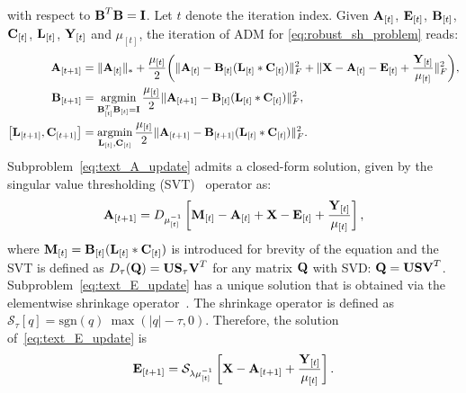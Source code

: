 with respect to $\boldsymbol{\mathbf{B}}^T \boldsymbol{\mathbf{B}} = \boldsymbol{\mathbf{I}}$. Let $t$ denote the iteration index. 
Given $\boldsymbol{\mathbf{A}}_{[t]}$, $\boldsymbol{\mathbf{E}}_{[t]}$, $\boldsymbol{\mathbf{B}}_{[t]}$, $\boldsymbol{\mathbf{C}}_{[t]}$, $\boldsymbol{\mathbf{L}}_{[t]}$, $\boldsymbol{\mathbf{Y}}_{[t]}$
and $\mu_{[t]}$, the iteration of ADM for \cref{eq:robust_sh_problem} reads:
\begin{align}
    \bb{A}_{[t+1]} &= \lVert \bb{A}_{[t]} \rVert_{*} + \frac{\mu_{[t]}}{2} \biggl( \lVert \bb{A}_{[t]} - \bb{B}_{[t]} (\bb{L}_{[t]} \ast \bb{C}_{[t]}) \rVert^{2}_{F} + \lVert \bb{X} - \bb{A}_{[t]} - \bb{E}_{[t]} + \frac{\bb{Y}_{[t]}}{\mu_{[t]}} \rVert_{F}^{2} \biggr), \label{eq:text_A_update} \\
    \bb{B}_{[t+1]} &= \argmin_{\bb{B}_{[t]}^T \bb{B}_{[t]} = \bb{I}} \frac{\mu_{[t]}}{2} \lVert \bb{A}_{[t+1]} - \bb{B}_{[t]} (\bb{L}_{[t]} \ast \bb{C}_{[t]}) \rVert_{F}^{2}, \label{eq:text_B_update} \\
    \left[ \bb{L}_{[t+1]}, \bb{C}_{[t+1]} \right] &= \argmin_{\bb{L}_{[t]}, \bb{C}_{[t]}} \frac{\mu_{[t]}}{2} \lVert \bb{A}_{[t+1]} - \bb{B}_{[t+1]} (\bb{L}_{[t]} \ast \bb{C}_{[t]}) \rVert_{F}^{2}. \label{eq:text_LC_update}
\end{align}
Subproblem~\eqref{eq:text_A_update} admits a closed-form solution, given by the
singular value thresholding (SVT)~\cite{Cai:2010hz} operator as:
\begin{equation}\label{eq:text_A_SVT}
    \boldsymbol{\mathbf{A}}_{[t+1]} = D_{\mu_{[t]}^{-1}} \left[ \boldsymbol{\mathbf{M}}_{[t]}  - \boldsymbol{\mathbf{A}}_{[t]} + \boldsymbol{\mathbf{X}} - \boldsymbol{\mathbf{E}}_{[t]} + \frac{\boldsymbol{\mathbf{Y}}_{[t]}}{\mu_{[t]}} \right],
\end{equation}
where $\boldsymbol{\mathbf{M}}_{[t]} = \boldsymbol{\mathbf{B}}_{[t]} (\boldsymbol{\mathbf{L}}_{[t]} \ast \boldsymbol{\mathbf{C}}_{[t]})$ is introduced 
for brevity of the equation and the SVT is defined as
$D_{\tau}(\boldsymbol{\mathbf{Q}}) = \boldsymbol{\mathbf{U}} \boldsymbol{\mathbf{S}}_{\tau} \boldsymbol{\mathbf{V}}^T$ for any matrix $\boldsymbol{\mathbf{Q}}$ with SVD:\@
$\boldsymbol{\mathbf{Q}} = \boldsymbol{\mathbf{U}} \boldsymbol{\mathbf{S}} \boldsymbol{\mathbf{V}}^T$. 
Subproblem~\eqref{eq:text_E_update} has a unique solution that is obtained via 
the elementwise shrinkage operator~\cite{RefWorks:321}. The shrinkage operator 
is defined as $\mathcal{S}_{\tau}[q]=\mbox{sgn}(q) \: \max(|q|-\tau, 0)$. 
Therefore, the solution of~\eqref{eq:text_E_update} is
\begin{equation}\label{eq:text_E_shrinkage}
    \boldsymbol{\mathbf{E}}_{[t+1]} = \mathcal{S}_{\lambda \mu_{[t]}^{-1}} \left[ \boldsymbol{\mathbf{X}} - \boldsymbol{\mathbf{A}}_{[t+1]} + \frac{\boldsymbol{\mathbf{Y}}_{[t]}}{\mu_{[t]}} \right].
\end{equation}
